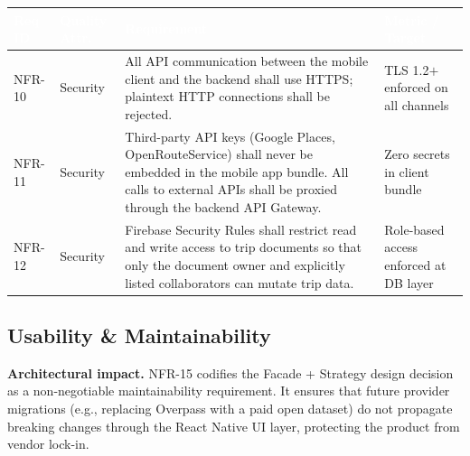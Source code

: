 \documentclass[12pt, a4paper]{article}
\newcommand{\reqid}[1]{\textsc{\small #1}}
\newcommand{\thcell}[1]{\textcolor{white}{\textbf{\small #1}}}
\begin{document}
\vspace{0.4em}
\begin{longtable}{C{1.5cm} C{2.4cm} L{7.0cm} C{2.7cm}}
\toprule
{}
\thcell{Req ID} & \thcell{Quality Attr.} & \thcell{Requirement} & \thcell{Metric / Target} \\
\midrule
\endhead
\bottomrule
\endfoot

\reqid{NFR-10} & Security &
All API communication between the mobile client and the backend shall use HTTPS; plaintext HTTP connections shall be rejected. &
TLS 1.2$+$ enforced on all channels \\

\reqid{NFR-11} & Security &
Third-party API keys (Google Places, OpenRouteService) shall never be embedded in the mobile app bundle. All calls to external APIs shall be proxied through the backend API Gateway. &
Zero secrets in client bundle \\

\reqid{NFR-12} & Security &
Firebase Security Rules shall restrict read and write access to trip documents so that only the document owner and explicitly listed collaborators can mutate trip data. &
Role-based access enforced at DB layer \\

\end{longtable}

\subsection{Usability \& Maintainability}

\begin{tcolorbox}[notebox]
  \textbf{Architectural impact.} NFR-15 codifies the Facade + Strategy design decision as a non-negotiable maintainability requirement. It ensures that future provider migrations (e.g., replacing Overpass with a paid open dataset) do not propagate breaking changes through the React Native UI layer, protecting the product from vendor lock-in.
\end{tcolorbox}
\end{document}
